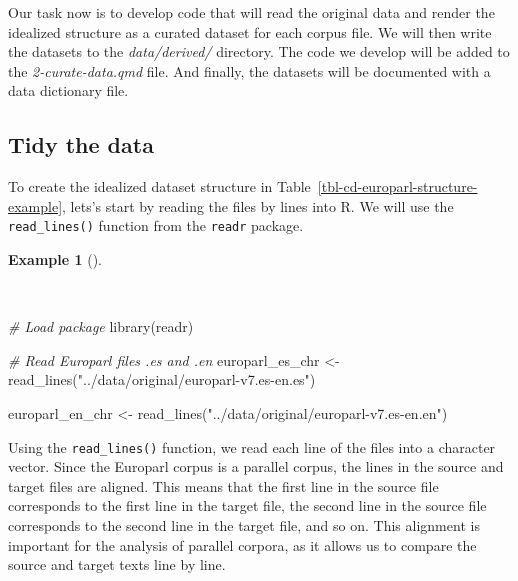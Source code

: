 \documentclass[
  letterpaper,
]{latex/krantz}
\newenvironment{Shaded}{\begin{snugshade}}{\end{snugshade}}
\newcommand{\CommentTok}[1]{\textcolor[rgb]{0.00,0.00,0.00}{\textit{#1}}}
\newcommand{\FunctionTok}[1]{\textcolor[rgb]{0.00,0.00,0.00}{#1}}
\newcommand{\NormalTok}[1]{\textcolor[rgb]{0.00,0.00,0.00}{#1}}
\newcommand{\OtherTok}[1]{\textcolor[rgb]{0.00,0.00,0.00}{#1}}
\newcommand{\StringTok}[1]{\textcolor[rgb]{0.00,0.00,0.00}{#1}}
\theoremstyle{definition}
\newtheorem{example}{Example}[chapter]
\theoremstyle{remark}
\begin{document}
Our task now is to develop code that will read the original data and
render the idealized structure as a curated dataset for each corpus
file. We will then write the datasets to the \emph{data/derived/}
directory. The code we develop will be added to the
\emph{2-curate-data.qmd} file. And finally, the datasets will be
documented with a data dictionary file.

\subsection{Tidy the data}\label{tidy-the-data}

To create the idealized dataset structure in
Table~\ref{tbl-cd-europarl-structure-example}, lets's start by reading
the files by lines into R. We will use the \texttt{read\_lines()}
function from the \texttt{readr} package.

\begin{example}[]\protect\hypertarget{exm-cd-europarl-readr}{}\label{exm-cd-europarl-readr}

~

\begin{Shaded}
\begin{Highlighting}[]
\CommentTok{\# Load package}
\FunctionTok{library}\NormalTok{(readr)}

\CommentTok{\# Read Europarl files .es and .en}
\NormalTok{europarl\_es\_chr }\OtherTok{\textless{}{-}}
  \FunctionTok{read\_lines}\NormalTok{(}\StringTok{"../data/original/europarl{-}v7.es{-}en.es"}\NormalTok{)}

\NormalTok{europarl\_en\_chr }\OtherTok{\textless{}{-}}
  \FunctionTok{read\_lines}\NormalTok{(}\StringTok{"../data/original/europarl{-}v7.es{-}en.en"}\NormalTok{)}
\end{Highlighting}
\end{Shaded}

\end{example}

Using the \texttt{read\_lines()} function, we read each line of the
files into a character vector. Since the Europarl corpus is a parallel
corpus, the lines in the source and target files are aligned. This means
that the first line in the source file corresponds to the first line in
the target file, the second line in the source file corresponds to the
second line in the target file, and so on. This alignment is important
for the analysis of parallel corpora, as it allows us to compare the
source and target texts line by line.
\end{document}
